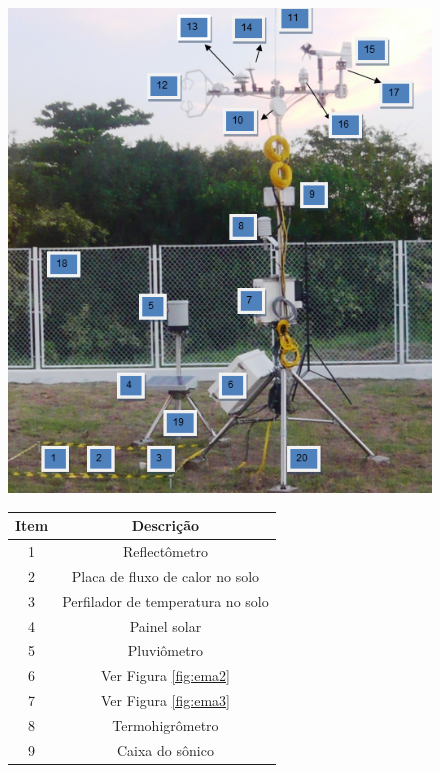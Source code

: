 \begin{figure}
\begin{minipage}{\textwidth}
  \begin{minipage}[b]{0.59\textwidth}
    \centering
    	\includegraphics[width=\textwidth]{./img/ema5.png}
  \end{minipage}
  \hfill
  \begin{minipage}[b]{0.39\textwidth}
    \centering
		\begin{footnotesize}
		\begin{tabular}{cc}
		\toprule
		Item & Descrição\\
		\midrule
		1 & Reflectômetro \\
		2 & Placa de fluxo de calor no solo\\
		3 & Perfilador de temperatura no solo\\
		4 & Painel solar\\
		5 & Pluviômetro \\
		6 & Ver Figura \ref{fig:ema2}\\
		7 & Ver Figura \ref{fig:ema3}\\
		8 & Termohigrômetro\\
		9 & Caixa do sônico\\

\end{tabular}
\end{footnotesize}
\end{minipage}
\end{minipage}
\end{figure}
